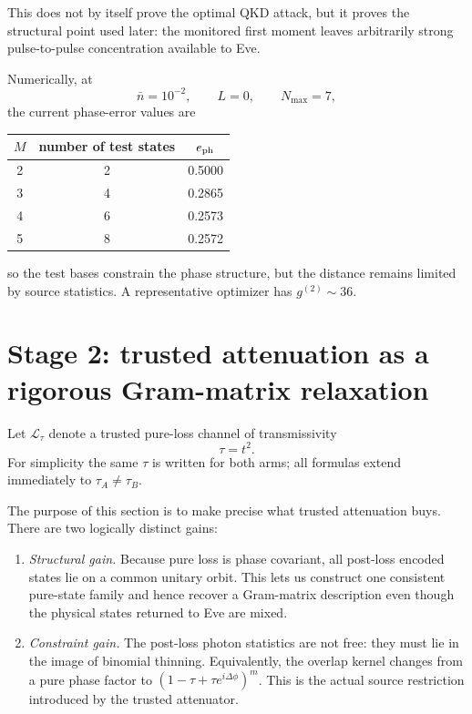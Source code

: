 \documentclass[11pt]{article}
\theoremstyle{remark}
\begin{document}
This does not by itself prove the optimal QKD attack, but it proves the
structural point used later: the monitored first moment leaves arbitrarily
strong pulse-to-pulse concentration available to Eve.

Numerically, at
\[
    \bar n=10^{-2},
    \qquad L=0,
    \qquad N_{\max}=7,
\]
the current phase-error values are
\begin{center}
\begin{tabular}{ccc}
\toprule
\(M\) & number of test states & \(e_{\rm ph}\) \\
\midrule
2 & 2 & 0.5000 \\
3 & 4 & 0.2865 \\
4 & 6 & 0.2573 \\
5 & 8 & 0.2572 \\
\bottomrule
\end{tabular}
\end{center}
so the test bases constrain the phase structure, but the distance remains
limited by source statistics. A representative optimizer has
\(g^{(2)}\sim36\).

\section{Stage 2: trusted attenuation as a rigorous Gram-matrix relaxation}
\label{sec:stage2-rigorous}

Let \(\mathcal L_\tau\) denote a trusted pure-loss channel of transmissivity
\[
    \tau=t^2.
\]
For simplicity the same \(\tau\) is written for both arms; all formulas extend
immediately to \(\tau_A\neq\tau_B\).

The purpose of this section is to make precise what trusted attenuation buys.
There are two logically distinct gains:

\begin{enumerate}
    \item \emph{Structural gain.}  Because pure loss is phase covariant, all
    post-loss encoded states lie on a common unitary orbit.  This lets us
    construct one consistent pure-state family and hence recover a Gram-matrix
    description even though the physical states returned to Eve are mixed.

    \item \emph{Constraint gain.}  The post-loss photon statistics are not free:
    they must lie in the image of binomial thinning.  Equivalently, the overlap
    kernel changes from a pure phase factor to
    \((1-\tau+\tau e^{i\Delta\phi})^m\).  This is the actual source restriction
    introduced by the trusted attenuator.
\end{enumerate}
\end{document}
